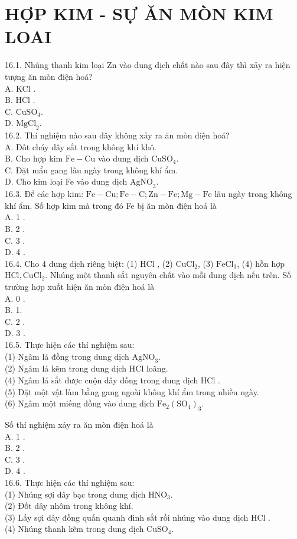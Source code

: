 \documentclass[10pt]{article}
\begin{document}
\section*{HỢP KIM - SỰ ĂN MÒN KIM LOAI}
16.1. Nhúng thanh kim loại Zn vào dung dịch chất nào sau đây thì xảy ra hiện tượng ăn mòn điện hoá?\\
A. KCl .\\
B. HCl .\\
C. $\mathrm{CuSO}_{4}$.\\
D. $\mathrm{MgCl}_{2}$.\\
16.2. Thí nghiệm nào sau đây không xảy ra ăn mòn điện hoá?\\
A. Đốt cháy dây sắt trong không khí khô.\\
B. Cho hợp kim $\mathrm{Fe}-\mathrm{Cu}$ vào dung dịch $\mathrm{CuSO}_{4}$.\\
C. Đặt mẩu gang lâu ngày trong không khí ẩm.\\
D. Cho kim loại Fe vào dung dịch $\mathrm{AgNO}_{3}$.\\
16.3. Để các hợp kim: $\mathrm{Fe}-\mathrm{Cu} ; \mathrm{Fe}-\mathrm{C} ; \mathrm{Zn}-\mathrm{Fe} ; \mathrm{Mg}-\mathrm{Fe}$ lâu ngày trong không khí ẩm. Số hợp kim mà trong đó Fe bị ăn mòn điện hoá là\\
A. 1 .\\
B. 2 .\\
C. 3 .\\
D. 4 .\\
16.4. Cho 4 dung dịch riêng biệt: (1) HCl , (2) $\mathrm{CuCl}_{2}$, (3) $\mathrm{FeCl}_{3}$, (4) hỗn hợp $\mathrm{HCl}, \mathrm{CuCl}_{2}$. Nhúng một thanh sắt nguyên chất vào mỗi dung dịch nếu trên. Số trường hợp xuất hiện ăn mòn điện hoá là\\
A. 0 .\\
B. 1.\\
C. 2 .\\
D. 3 .\\
16.5. Thực hiện các thí nghiệm sau:\\
(1) Ngâm lá đồng trong dung dịch $\mathrm{AgNO}_{3}$.\\
(2) Ngâm lá kẽm trong dung dịch HCl loãng.\\
(4) Ngâm lá sắt được cuộn dây đồng trong dung dịch HCl .\\
(5) Đặt một vật làm bằng gang ngoài không khí ẩm trong nhiều ngày.\\
(6) Ngâm một miếng đồng vào dung dịch $\mathrm{Fe}_{2}\left(\mathrm{SO}_{4}\right)_{3}$.

Số thí nghiệm xảy ra ăn mòn điện hoá là\\
A. 1 .\\
B. 2 .\\
C. 3 .\\
D. 4 .\\
16.6. Thực hiện các thí nghiệm sau:\\
(1) Nhúng sợi dây bạc trong dung dịch $\mathrm{HNO}_{3}$.\\
(2) Đốt dây nhôm trong không khí.\\
(3) Lấy sợi dây đồng quấn quanh đinh sắt rồi nhúng vào dung dịch HCl .\\
(4) Nhúng thanh kẽm trong dung dịch $\mathrm{CuSO}_{4}$.
\end{document}

